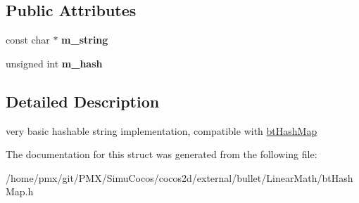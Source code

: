 \subsection*{Public Attributes}
\begin{DoxyCompactItemize}
\item 
\mbox{\label{structbtHashString_a735674ce51e268fa4f5f2df54d97787a}} 
const char $\ast$ {\bfseries m\+\_\+string}
\item 
\mbox{\label{structbtHashString_ae33a1798eaa8fdac9d75fd0cc226cc09}} 
unsigned int {\bfseries m\+\_\+hash}
\end{DoxyCompactItemize}


\subsection{Detailed Description}
very basic hashable string implementation, compatible with \hyperlink{classbtHashMap}{bt\+Hash\+Map} 

The documentation for this struct was generated from the following file\+:\begin{DoxyCompactItemize}
\item 
/home/pmx/git/\+P\+M\+X/\+Simu\+Cocos/cocos2d/external/bullet/\+Linear\+Math/bt\+Hash\+Map.\+h\end{DoxyCompactItemize}

